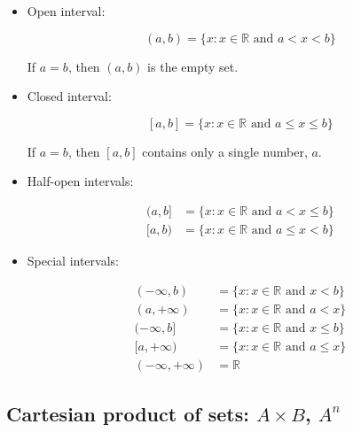 \documentclass[titlepage]{article}
\begin{document}
        \begin{itemize}
          \item Open interval:

                $$(a, b) = \{x : x \in \mathbb{R} \text{ and } a < x < b \}$$

                If $a = b$, then $(a, b)$ is the empty set.

          \item Closed interval:

                $$
                  [a, b]
                    = \{x : x \in \mathbb{R} \text{ and } a \leq x \leq b \}
                $$

                If $a = b$, then $[a, b]$ contains only a single number,
                $a$.

          \item Half-open intervals:

                \begin{align*}
                  (a, b]
                    & = \{x : x \in \mathbb{R} \text{ and } a < x \leq b \} \\
                  [a, b)
                    & = \{x : x \in \mathbb{R} \text{ and } a \leq x < b \}
                \end{align*}

          \item Special intervals:

                \begin{align*}
                  (-\infty, b)
                    & = \{x : x \in \mathbb{R} \text{ and } x < b\} \\
                  (a, +\infty)
                    & = \{x : x \in \mathbb{R} \text{ and } a < x\} \\
                  (-\infty, b]
                    & = \{x : x \in \mathbb{R} \text{ and } x \leq b\} \\
                  [a, +\infty)
                    & = \{x : x \in \mathbb{R} \text{ and } a \leq x\} \\
                  (-\infty, +\infty) & = \mathbb{R}
                \end{align*}
        \end{itemize}

      \subsection{Cartesian product of sets: $A \times B$, $A^n$}
\end{document}

